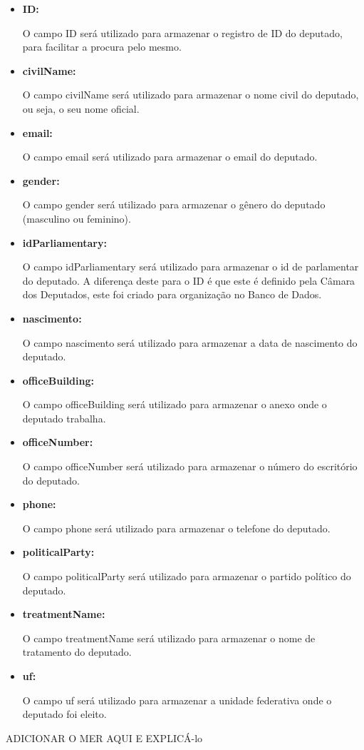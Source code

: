 	\begin{itemize}
		\item \textbf{ID:}

			O campo ID será utilizado para armazenar o registro de ID do deputado, para facilitar a procura pelo mesmo.

		\item \textbf{civilName:}

			O campo civilName será utilizado para armazenar o nome civil do deputado, ou seja, o seu nome oficial.

		\item \textbf{email:}

			O campo email será utilizado para armazenar o email do deputado.

		\item \textbf{gender:}

			O campo gender será utilizado para armazenar o gênero do deputado (masculino ou feminino).

		\item \textbf{idParliamentary:}

			O campo idParliamentary será utilizado para armazenar o id de parlamentar do deputado. A diferença deste para o ID é que este é definido pela Câmara dos Deputados, este foi criado para organização no Banco de Dados.

		\item \textbf{nascimento:}

			O campo nascimento será utilizado para armazenar a data de nascimento do deputado.

		\item \textbf{officeBuilding:}

			O campo officeBuilding será utilizado para armazenar o anexo onde o deputado trabalha.

		\item \textbf{officeNumber:}

			O campo officeNumber será utilizado para armazenar o número do escritório do deputado.

		\item \textbf{phone:}

			O campo phone será utilizado para armazenar o telefone do deputado.

		\item \textbf{politicalParty:}

			O campo politicalParty será utilizado para armazenar o partido político do deputado.

		\item \textbf{treatmentName:}

			O campo treatmentName será utilizado para armazenar o nome de tratamento do deputado.

		\item \textbf{uf:}

			O campo uf será utilizado para armazenar a unidade federativa onde o deputado foi eleito.

			

			
			
			

			
			

			

			

			

	\end{itemize}
ADICIONAR O MER AQUI E EXPLICÁ-lo
